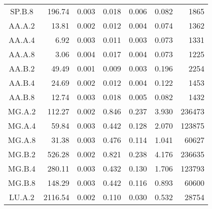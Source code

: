 \begin{ThreePartTable}
\begin{longtable}[c]{c*{6}{r}}
    SP.B.8                 & 196.74                              & 0.003                               & 0.018          & 0.006 & 0.082 & 1865   \\
    AA.A.2                 & 13.81                               & 0.002                               & 0.012          & 0.004 & 0.074 & 1362   \\
    AA.A.4                 & 6.92                                & 0.003                               & 0.011          & 0.003 & 0.073 & 1331   \\
    AA.A.8                 & 3.06                                & 0.004                               & 0.017          & 0.004 & 0.073 & 1225   \\
    AA.B.2                 & 49.49                               & 0.001                               & 0.009          & 0.003 & 0.196 & 2254   \\
    AA.B.4                 & 24.69                               & 0.002                               & 0.012          & 0.004 & 0.122 & 1453   \\
    AA.B.8                 & 12.74                               & 0.003                               & 0.018          & 0.005 & 0.082 & 1432   \\
    MG.A.2                 & 112.27                              & 0.002                               & 0.846          & 0.237 & 3.930 & 236473 \\
    MG.A.4                 & 59.84                               & 0.003                               & 0.442          & 0.128 & 2.070 & 123875 \\
    MG.A.8                 & 31.38                               & 0.003                               & 0.476          & 0.114 & 1.041 & 60627  \\
    MG.B.2                 & 526.28                              & 0.002                               & 0.821          & 0.238 & 4.176 & 236635 \\
    MG.B.4                 & 280.11                              & 0.003                               & 0.432          & 0.130 & 1.706 & 123793 \\
    MG.B.8                 & 148.29                              & 0.003                               & 0.442          & 0.116 & 0.893 & 60600  \\
    LU.A.2                 & 2116.54                             & 0.002                               & 0.110          & 0.030 & 0.532 & 28754  \\

\end{longtable}
\end{ThreePartTable}
